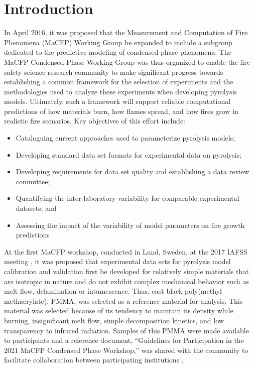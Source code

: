 \documentclass{book}
\begin{document}
\chapter{Introduction}
In April 2016, it was proposed that the Measurement and Computation of Fire Phenomena (MaCFP) Working Group be expanded to include a subgroup dedicated to the predictive modeling of condensed phase phenomena. The MaCFP Condensed Phase Working Group was thus organized to enable the fire safety science research community to make significant progress towards establishing a common framework for the selection of experiments and the methodologies used to analyze these experiments when developing pyrolysis models. Ultimately, such a framework will support reliable computational predictions of how materials burn, how flames spread, and how fires grow in realistic fire scenarios. Key objectives of this effort include:
\begin{itemize}
 \item Cataloguing current approaches used to parameterize pyrolysis models;
 \item Developing standard data set formats for experimental data on pyrolysis;
 \item Developing requirements for data set quality and establishing a data review committee;
 \item Quantifying the inter-laboratory variability for comparable experimental datasets; and
 \item Assessing the impact of the variability of model parameters on fire growth predictions
\end{itemize}
At the first MaCFP workshop, conducted in Lund, Sweden, at the 2017 IAFSS meeting \cite{brown2018proceedings}, it was proposed that experimental data sets for pyrolysis model calibration and validation first be developed for relatively simple materials that are isotropic in nature and do not exhibit complex mechanical behavior such as melt flow, delamination or intumescence. Thus, cast black poly(methyl methacrylate), PMMA, was selected as a reference material for analysis. This material was selected because of its tendency to maintain its density while burning, insignificant melt flow, simple decomposition kinetics, and low transparency to infrared radiation. Samples of this PMMA were made available to participants and a reference document, ``Guidelines for Participation in the 2021 MaCFP Condensed Phase Workshop,'' was shared with the community to facilitate collaboration between participating institutions \cite{MaCFP_Guidelines_for_Part}.
\end{document}
